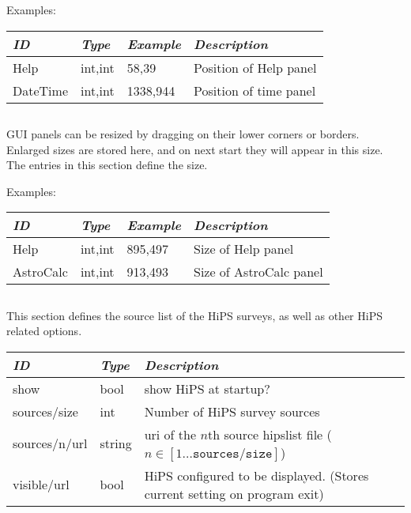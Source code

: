 Examples:

\noindent%
\begin{tabularx}{\textwidth}{l|l|l|X}
\toprule
\emph{ID}     & \emph{Type} & \emph{Example}&\emph{Description}     \\\midrule
Help          & int,int     &  58,39        & Position of Help panel\\%
DateTime      & int,int     &  1338,944     & Position of time panel\\\bottomrule
\end{tabularx}


\subsection{}

GUI panels can be resized by dragging on their lower corners or borders.  
Enlarged sizes are stored here, and on next start they will appear in this size.
The entries in this section define the size.

Examples:

\noindent%
\begin{tabularx}{\textwidth}{l|l|l|X}
\toprule
\emph{ID}     & \emph{Type} & \emph{Example}&\emph{Description}      \\\midrule
Help          & int,int     &  895,497      & Size of Help panel     \\%
AstroCalc     & int,int     &  913,493      & Size of AstroCalc panel\\\bottomrule
\end{tabularx}


\subsection{}
\label{sec:config.ini:hips}

This section defines the source list of the HiPS surveys, as well as other
HiPS related options.

\noindent%
\begin{tabularx}{\textwidth}{l|l|X}\toprule
\emph{ID}     & \emph{Type} & \emph{Description}\\\midrule
show          & bool        & show HiPS at startup? \\
sources/size  & int         & Number of HiPS survey sources\\%
sources/n/url & string      & uri of the $n$th source hipslist file ($n \in [1 \ldots \mathtt{sources/size}]$)\\
visible/url   & bool        & HiPS configured to be displayed. (Stores current setting on program exit)\\\bottomrule
\end{tabularx}



